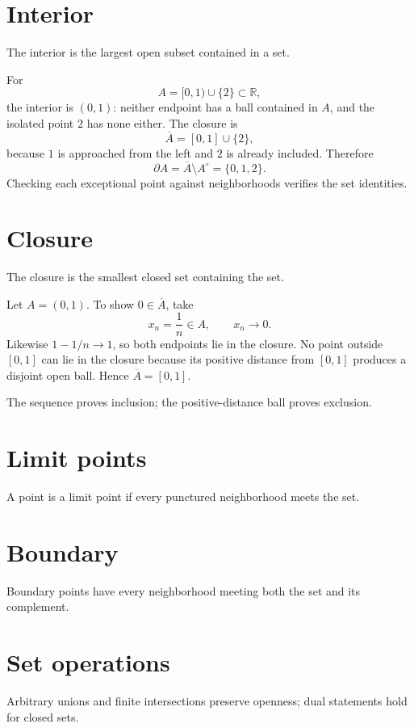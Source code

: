 \section{Interior}
The interior is the largest open subset contained in a set.


\begin{example}\label{ex:ii04-expand-01}
For
\[
A=[0,1)\cup\{2\}\subset\mathbb R,
\]
the interior is \((0,1)\): neither endpoint has a ball contained in \(A\), and
the isolated point \(2\) has none either. The closure is
\[
\overline A=[0,1]\cup\{2\},
\]
because \(1\) is approached from the left and \(2\) is already included.
Therefore
\[
\partial A=\overline A\setminus A^\circ=\{0,1,2\}.
\]
Checking each exceptional point against neighborhoods verifies the set
identities.
\end{example}
\section{Closure}
The closure is the smallest closed set containing the set.


\begin{example}\label{ex:ii04-expand-02}
Let \(A=(0,1)\). To show \(0\in\overline A\), take
\[
x_n=\frac1n\in A,\qquad x_n\to0.
\]
Likewise \(1-1/n\to1\), so both endpoints lie in the closure. No point outside
\([0,1]\) can lie in the closure because its positive distance from \([0,1]\)
produces a disjoint open ball. Hence \(\overline A=[0,1]\).

The sequence proves inclusion; the positive-distance ball proves exclusion.
\end{example}
\section{Limit points}
A point is a limit point if every punctured neighborhood meets the set.

\section{Boundary}
Boundary points have every neighborhood meeting both the set and its complement.

\section{Set operations}
Arbitrary unions and finite intersections preserve openness; dual statements hold for closed sets.

